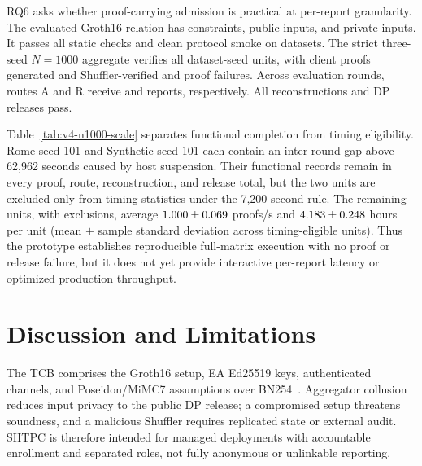 \documentclass[journal]{IEEEtran}
\theoremstyle{definition}
\theoremstyle{plain}
\begin{document}
RQ6 asks whether proof-carrying admission is practical at per-report
granularity. The evaluated Groth16 relation has \VFourConstraints{}
constraints, \VFourPublicInputs{} public inputs, and \VFourPrivateInputs{}
private inputs. It passes all \VFourStaticChecks{} static checks and clean
protocol smoke on \VFourProtocolDatasets{} datasets. The strict three-seed
\(N{=}1000\) aggregate verifies all \VFourScaleUnits{} dataset-seed units,
with \VFourScaleProofs{} client proofs generated and Shuffler-verified and
\VFourScaleProofFailures{} proof failures. Across
\VFourScaleEvaluationRounds{} evaluation rounds, routes A and R receive
\VFourScaleRouteA{} and \VFourScaleRouteR{} reports, respectively. All
\VFourScaleReconstructions{} reconstructions and \VFourScaleDPReleases{} DP
releases pass.


\FloatBarrier

Table~\ref{tab:v4-n1000-scale} separates functional completion from timing
eligibility. Rome seed 101 and Synthetic seed 101 each contain an inter-round
gap above 62{,}962 seconds caused by host suspension. Their functional records
remain in every proof, route, reconstruction, and release total, but the two
units are excluded only from timing statistics under the 7,200-second rule.
The remaining \VFourScaleTimingUnits{} units, with
\VFourScaleTimingExcluded{} exclusions, average
\(1.000{}\pm0.069{}\) proofs/s and
\(4.183{}\pm0.248{}\) hours per unit
(mean \(\pm\) sample standard deviation across timing-eligible units). Thus the
prototype establishes reproducible full-matrix execution with no proof or
release failure, but it does not yet provide interactive per-report latency or
optimized production throughput.

\FloatBarrier
\section{Discussion and Limitations}
\label{sec:discussion}

The TCB comprises the Groth16 setup, EA Ed25519 keys, authenticated channels,
and Poseidon/MiMC7 assumptions over BN254~\cite{shoup97}. Aggregator collusion
reduces input privacy to the public DP release; a compromised setup threatens
soundness, and a malicious Shuffler requires replicated state or external
audit. SHTPC is therefore intended for managed deployments with accountable
enrollment and separated roles, not fully anonymous or unlinkable reporting.
\end{document}
